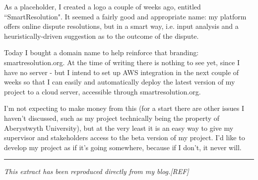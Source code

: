 As a placeholder, I created a logo a couple of weeks ago, entitled ``SmartResolution". It seemed a fairly good and appropriate name: my platform offers online dispute resolutions, but in a smart way, i.e. input analysis and a heuristically-driven suggestion as to the outcome of the dispute.

Today I bought a domain name to help reinforce that branding: smartresolution.org. At the time of writing there is nothing to see yet, since I have no server - but I intend to set up AWS integration in the next couple of weeks so that I can easily and automatically deploy the latest version of my project to a cloud server, accessible through smartresolution.org.

I'm not expecting to make money from this (for a start there are other issues I haven't discussed, such as my project technically being the property of Aberystwyth University), but at the very least it is an easy way to give my supervisor and stakeholders access to the beta version of my project. I'd like to develop my project as if it's going somewhere, because if I don't, it never will.

\rule{\textwidth}{1pt}

\emph{This extract has been reproduced directly from my blog.[REF]} %